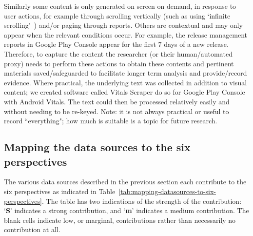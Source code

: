 Similarly some content is only generated on screen on demand, in response to user actions, for example through scrolling vertically (such as using `infinite scrolling'~\citep{parker2012_infinite_scrolling}) and/or paging through reports. Others are contextual and may only appear when the relevant conditions occur. For example, the release management reports in Google Play Console appear for the first 7 days of a new release. Therefore, to capture the content the researcher (or their human/automated proxy) needs to perform these actions to obtain these contents and pertinent materials saved/safeguarded to facilitate longer term analysis and provide/record evidence. Where practical, the underlying text was collected in addition to visual content; we created software called Vitals Scraper do so for Google Play Console with Android Vitals. The text could then be processed relatively easily and without needing to be re-keyed. Note: it is not always practical or useful to record ``everything"; how much is suitable is a topic for future research. 

\subsection{Mapping the data sources to the six perspectives}
The various data sources described in the previous section each contribute to the six perspectives as indicated in Table~\ref{tab:mapping-datasources-to-six-perspectives}. The table has two indications of the strength of the contribution: `\textbf{S}' indicates a strong contribution, and `\textbf{m}' indicates a medium contribution. The blank cells indicate low, or marginal, contributions rather than necessarily no contribution at all.

